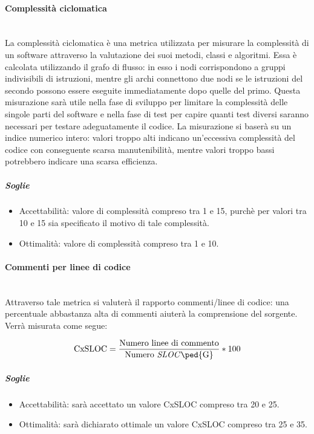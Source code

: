 \paragraph{Complessità ciclomatica}
	~\\La complessità ciclomatica è una metrica utilizzata per misurare la complessità di un software attraverso la valutazione dei suoi metodi, classi e algoritmi. Essa è calcolata utilizzando il grafo di flusso: in esso i nodi corrispondono a gruppi indivisibili di istruzioni, mentre gli archi connettono due nodi se le istruzioni del secondo possono essere eseguite immediatamente dopo quelle del primo.
Questa misurazione sarà utile nella fase di sviluppo per limitare la complessità delle singole parti del software e nella fase di test per capire quanti test diversi saranno necessari per testare adeguatamente il codice.
La misurazione si baserà su un indice numerico intero: valori troppo alti indicano un'eccessiva complessità del codice con conseguente scarsa manutenibilità, mentre valori troppo bassi potrebbero indicare una scarsa efficienza.

\subparagraph{Soglie}
	\begin{itemize}
	\item Accettabilità: valore di complessità compreso tra 1 e 15, purchè per valori tra 10 e 15 sia specificato il motivo di tale complessità.
 	\item Ottimalità: valore di complessità compreso tra 1 e 10.
	\end{itemize}

\paragraph{Commenti per linee di codice}
	~\\Attraverso tale metrica si valuterà il rapporto commenti/linee di codice: una percentuale abbastanza alta di commenti aiuterà la comprensione del sorgente. Verrà misurata come segue:

	\begin{displaymath}
		\mbox{CxSLOC} =\frac{\mbox{Numero linee di commento}}{\mbox{Numero \emph{SLOC}\ped{G}}} * 100
	\end{displaymath}

\subparagraph{Soglie}
	\begin{itemize}
	\item Accettabilità: sarà accettato un valore CxSLOC compreso tra 20 e 25.
	\item Ottimalità: sarà dichiarato ottimale un valore CxSLOC compreso tra 25 e 35.
	\end{itemize}

